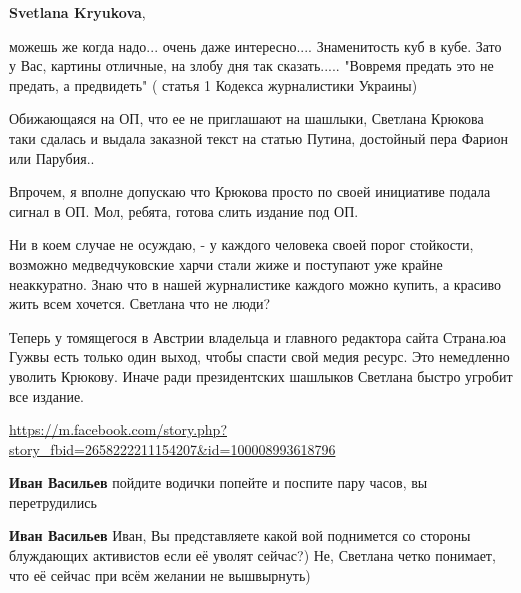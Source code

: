 \begin{itemize}
\textbf{Svetlana Kryukova}, 

можешь же когда надо... очень даже интересно.... Знаменитость куб в кубе. Зато у
Вас, картины отличные, на злобу дня так сказать..... "Вовремя предать это не
предать, а предвидеть"
( статья 1 Кодекса журналистики Украины)

Обижающаяся на ОП, что ее не приглашают на шашлыки, Светлана Крюкова таки
сдалась и выдала заказной текст на статью Путина, достойный пера Фарион или
Парубия..

Впрочем, я вполне допускаю что Крюкова просто по своей инициативе подала сигнал
в ОП. Мол, ребята, готова слить издание под ОП.

Ни в коем случае не осуждаю, - у каждого человека своей порог стойкости,
возможно медведчуковские харчи стали жиже и поступают уже крайне неаккуратно.
Знаю что в нашей журналистике каждого можно купить, а красиво жить всем
хочется. Светлана что не люди?

Теперь у томящегося в Австрии владельца и главного редактора сайта Страна.юа
Гужвы есть только один выход, чтобы спасти свой медия ресурс. Это немедленно
уволить Крюкову. Иначе ради президентских шашлыков Светлана быстро угробит все
издание. 

\url{https://m.facebook.com/story.php?story_fbid=2658222211154207&id=100008993618796}

\begin{itemize}

 
\textbf{Иван Васильев} пойдите водички попейте и поспите пару часов, вы перетрудились

 
\textbf{Иван Васильев} Иван, Вы представляете какой вой поднимется со стороны блуждающих активистов если её уволят сейчас?) Не, Светлана четко понимает, что её сейчас при всём желании не вышвырнуть)

 

\end{itemize}
\end{itemize}
